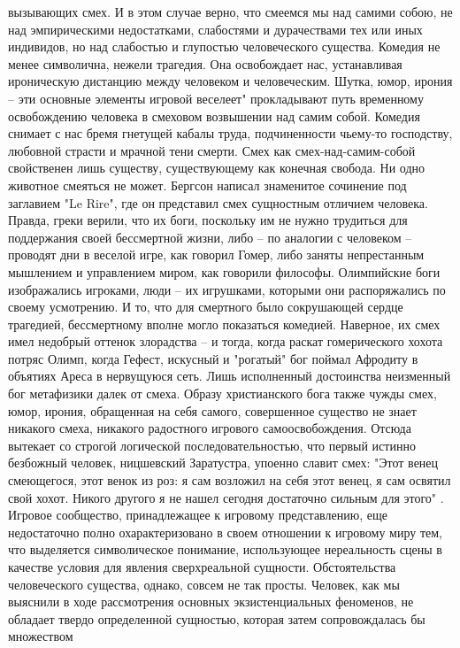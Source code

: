 \documentclass[12pt]{article}
\begin{document}
вызывающих  смех.  И  в  этом  случае  верно,  что  смеемся  мы  над  самими  собою,  не  над  эмпирическими
недостатками,  слабостями  и  дурачествами  тех  или  иных  индивидов,  но  над  слабостью  и  глупостью
человеческого существа. Комедия не менее символична, нежели трагедия. Она освобождает нас, устанавливая
ироническую дистанцию между человеком и человеческим. Шутка, юмор, ирония -- эти основные элементы
игровой веселеет" прокладывают путь временному освобождению человека в смеховом возвышении над самим
собой. Комедия снимает с нас бремя гнетущей кабалы труда, подчиненности чьему-то господству, любовной
страсти и мрачной тени смерти. Смех как смех-над-самим-собой свойственен лишь существу, существующему
как  конечная  свобода.  Ни  одно  животное  смеяться  не  может.  Бергсон  написал  знаменитое  сочинение  под
заглавием "Le Rire", где он представил смех сущностным отличием человека. Правда, греки верили, что их боги,
поскольку им не нужно трудиться для поддержания своей бессмертной жизни, либо -- по аналогии с человеком
-- проводят дни в веселой игре, как говорил Гомер, либо заняты непрестанным мышлением и управлением
миром, как говорили философы. Олимпийские боги изображались игроками, люди -- их игрушками, которыми
они распоряжались по своему усмотрению. И то, что для смертного было сокрушающей сердце трагедией,
бессмертному вполне могло показаться комедией. Наверное, их смех имел недобрый оттенок злорадства -- и
тогда,  когда  раскат  гомерического  хохота  потряс  Олимп,  когда  Гефест,  искусный  и  "рогатый"  бог  поймал
Афродиту в объятиях Ареса в нервущуюся сеть. Лишь исполненный достоинства неизменный бог метафизики
далек от смеха. Образу христианского бога также чужды смех, юмор, ирония, обращенная на себя самого,
совершенное существо не знает никакого смеха, никакого радостного игрового самоосвобождения.
Отсюда  вытекает  со  строгой  логической  последовательностью,  что  первый  истинно  безбожный  человек,
ницшевский Заратустра, упоенно славит смех: "Этот венец смеющегося, этот венок из роз: я сам возложил на
себя этот венец, я сам освятил свой хохот. Никого другого я не нашел сегодня достаточно сильным для этого" .
Игровое сообщество, принадлежащее к игровому представлению, еще недостаточно полно охарактеризовано в
своем отношении к игровому миру тем, что выделяется символическое понимание, использующее нереальность
сцены  в  качестве  условия  для  явления  сверхреальной  сущности.  Обстоятельства  человеческого  существа,
однако, совсем не так просты. Человек, как мы выяснили в ходе рассмотрения основных экзистенциальных
феноменов,  не  обладает  твердо  определенной  сущностью,  которая  затем  сопровождалась  бы  множеством
\end{document}
